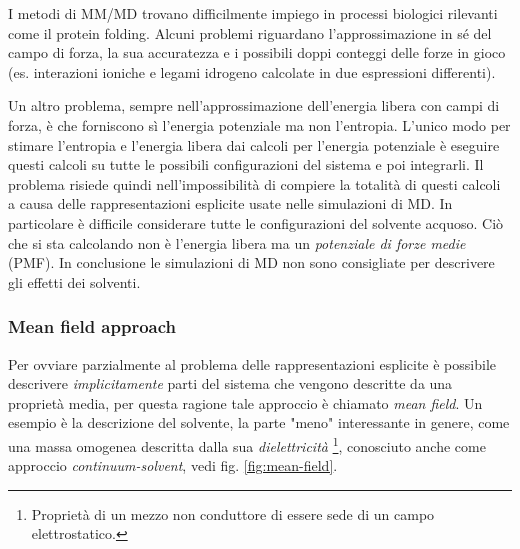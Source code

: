 {{\par I metodi di MM/MD trovano difficilmente impiego in processi biologici rilevanti come il protein folding. Alcuni problemi riguardano l'approssimazione in sé del campo di forza, la sua accuratezza e i possibili doppi conteggi delle forze in gioco (es. interazioni ioniche e legami idrogeno calcolate in due espressioni differenti). 

\par Un altro problema, sempre nell'approssimazione dell'energia libera con campi di forza, è che forniscono sì l'energia potenziale ma non l'entropia. L'unico modo per stimare l'entropia e l'energia libera dai calcoli per l'energia potenziale è eseguire questi calcoli su tutte le possibili configurazioni del sistema e poi integrarli. Il problema risiede quindi nell'impossibilità di compiere la totalità di questi calcoli a causa delle rappresentazioni esplicite usate nelle simulazioni di MD. In particolare è difficile considerare tutte le configurazioni del solvente acquoso. Ciò che si sta calcolando non è l'energia libera ma un \textit{potenziale di forze medie} (PMF). In conclusione le simulazioni di MD non sono consigliate per descrivere gli effetti dei solventi.

\subsubsection{Mean field approach}
Per ovviare parzialmente al problema delle rappresentazioni esplicite è possibile descrivere \textit{implicitamente} parti del sistema che vengono descritte da una proprietà media, per questa ragione tale approccio è chiamato \textit{mean field}. Un esempio è la descrizione del solvente, la parte "meno" interessante in genere, come una massa omogenea descritta dalla sua \textit{dielettricità} \footnote{Proprietà di un mezzo non conduttore di essere sede di un campo elettrostatico.}, conosciuto anche come approccio \textit{continuum-solvent}, vedi fig. \ref{fig:mean-field}.

}}

